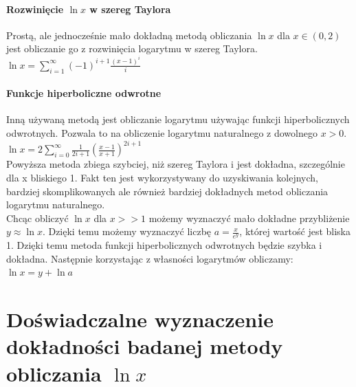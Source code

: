 \documentclass[10pt]{article}
\begin{document}
\paragraph{Rozwinięcie $\ln x$ w szereg Taylora}

Prostą, ale jednocześnie mało dokładną metodą obliczania $\ln x$ dla $x \in (0,2)$ jest obliczanie go z rozwinięcia logarytmu w szereg Taylora.\\

\begin{math}
\ln x = \sum_{i=1}^\infty
(-1)^{i+1} \frac{(x-1)^{i}}{i}
\end{math} \\

\paragraph{Funkcje hiperboliczne odwrotne}

Inną używaną metodą jest obliczanie logarytmu używając funkcji hiperbolicznych odwrotnych. Pozwala to na obliczenie logarytmu naturalnego z dowolnego $ x > 0 $.\\

\begin{math}
\ln x = 2 \sum_{i=0}^\infty
\frac{1}{2i + 1} \left(\frac{x-1}{x+1} \right)^{2i+1}
\end{math} \\

Powyższa metoda zbiega szybciej, niż szereg Taylora i jest dokładna, szczególnie dla x bliskiego 1. Fakt ten jest wykorzystywany do uzyskiwania kolejnych, bardziej skomplikowanych ale również bardziej dokładnych metod obliczania logarytmu naturalnego.\\
Chcąc obliczyć $\ln x$ dla $x >> 1$ możemy wyznaczyć mało dokładne przybliżenie $y \approx \ln x$. Dzięki temu możemy wyznaczyć liczbę $a = \frac{x}{e^{y}}$, której wartość jest bliska 1. Dzięki temu metoda funkcji hiperbolicznych odwrotnych będzie szybka i dokładna. Następnie korzystając z własności logarytmów obliczamy: \\
$\ln x = y + \ln a$\\


\section{Doświadczalne wyznaczenie dokładności badanej metody obliczania $\ln x$}
\end{document}
